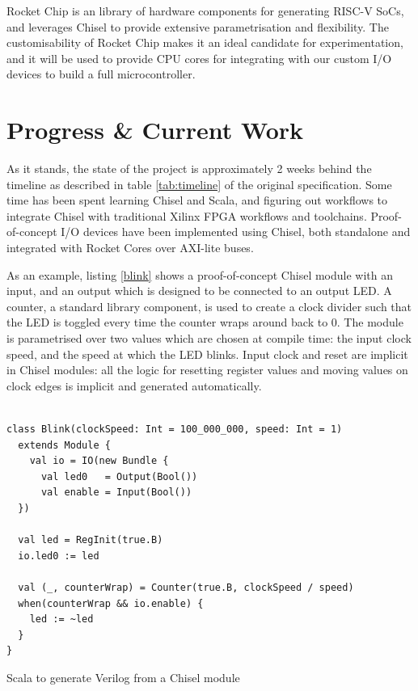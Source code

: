\documentclass[a4paper,fleqn,12pt]{article}
\begin{document}
Rocket Chip is an library of hardware components for generating RISC-V SoCs, and leverages Chisel to provide extensive parametrisation and flexibility. The customisability of Rocket Chip makes it an ideal candidate for experimentation, and it will be used to provide CPU cores for integrating with our custom I/O devices to build a full microcontroller.

\section{Progress \& Current Work}

As it stands, the state of the project is approximately 2 weeks behind the timeline as described in table \ref{tab:timeline} of the original specification. Some time has been spent learning Chisel and Scala, and figuring out workflows to integrate Chisel with traditional Xilinx FPGA workflows and toolchains. Proof-of-concept I/O devices have been implemented using Chisel, both standalone and integrated with Rocket Cores over AXI-lite buses.

As an example, listing \ref{blink} shows a proof-of-concept Chisel module with an  input, and an output  which is designed to be connected to an output LED. A counter, a standard library component, is used to create a clock divider such that the LED is toggled every time the counter wraps around back to 0. The module is parametrised over two values which are chosen at compile time: the input clock speed, and the speed at which the LED blinks. Input clock and reset are implicit in Chisel modules: all the logic for resetting register values and moving values on clock edges is implicit and generated automatically.


\begin{listing}[ht!]
	\vspace{0.5cm}
	\begin{verbatim}

class Blink(clockSpeed: Int = 100_000_000, speed: Int = 1) 
  extends Module {
    val io = IO(new Bundle {
      val led0   = Output(Bool())
      val enable = Input(Bool())
  })
  
  val led = RegInit(true.B)
  io.led0 := led
  
  val (_, counterWrap) = Counter(true.B, clockSpeed / speed)
  when(counterWrap && io.enable) {
    led := ~led
  }
}
    \end{verbatim}
	\caption{Scala to generate Verilog from a Chisel module}
	\label{blink}
\end{listing}
\end{document}
